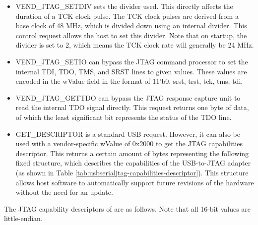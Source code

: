 \documentclass[main\_\_EN.tex]{subfiles}
\begin{document}
\begin{itemize}
\item VEND\_JTAG\_SETDIV sets the divider used. This directly affects the duration of a TCK clock pulse. The TCK clock pulses are derived from a base clock of 48 MHz, which is divided down using an internal divider. This control request allows the host to set this divider. Note that on startup, the divider is set to 2, which means the TCK clock rate will generally be 24 MHz.

\item VEND\_JTAG\_SETIO can bypass the JTAG command processor to set the internal TDI, TDO, TMS, and SRST lines to given values. These values are encoded in the wValue field in the format of {11'b0, srst, trst, tck, tms, tdi}.

\item VEND\_JTAG\_GETTDO can bypass the JTAG response capture unit to read the internal TDO signal directly. This request returns one byte of data, of which the least significant bit represents the status of the TDO line.

\item GET\_DESCRIPTOR is a standard USB request. However, it can also be used with a vendor-specific wValue of 0x2000 to get the JTAG capabilities descriptor. This returns a certain amount of bytes representing the following fixed structure, which describes the capabilities of the USB-to-JTAG adapter (as shown in Table \ref{tab:usbserialjtag-capabilities-descriptor}). This structure allows host software to automatically support future revisions of the hardware without the need for an update.
\end{itemize}


The JTAG capability descriptors of \chipname{} are as follows. Note that all 16-bit values are little-endian.
\end{document}
